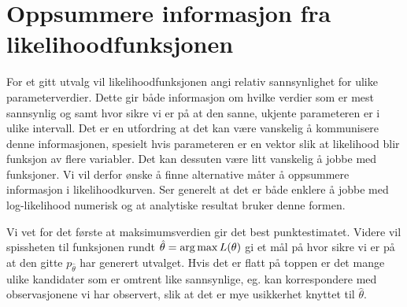 \section{Oppsummere informasjon fra likelihoodfunksjonen}
For et gitt utvalg vil likelihoodfunksjonen angi relativ sannsynlighet for ulike parameterverdier. Dette gir både informasjon om hvilke verdier som er mest sannsynlig og samt hvor sikre vi er på at den sanne, ukjente parameteren er i ulike intervall. Det er en utfordring at det kan være vanskelig å kommunisere denne informasjonen, spesielt hvis parameteren er en vektor slik at likelihood blir funksjon av flere variabler. Det kan dessuten være litt vanskelig å jobbe med funksjoner. Vi vil derfor ønske å finne alternative måter å oppsummere informasjon i likelihoodkurven. Ser generelt at det er både enklere å jobbe med log-likelihood numerisk og at analytiske resultat bruker denne formen.

Vi vet for det første at maksimumsverdien gir det best punktestimatet. Videre vil spissheten til funksjonen rundt $\hat{\theta} = \operatorname*{arg\,max} L(\theta)$ gi et mål på hvor sikre vi er på at den gitte $p_{\hat{\theta}}$ har generert utvalget. Hvis det er flatt på toppen er det mange ulike kandidater som er omtrent like sannsynlige, eg. kan korrespondere med observasjonene vi har observert, slik at det er mye usikkerhet knyttet til $\hat{\theta}$.
